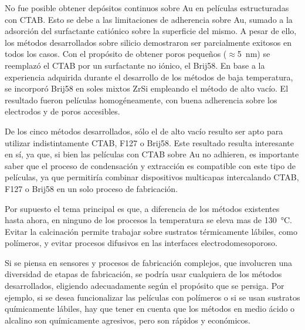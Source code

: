 	No fue posible obtener depósitos continuos sobre Au en películas estructuradas con CTAB. Esto se debe a las limitaciones de adherencia sobre Au, sumado a la adsorción del surfactante catiónico sobre la superficie del mismo. A pesar de ello, los métodos desarrollados sobre silicio demostraron ser parcialmente exitosos en todos los casos. Con el propósito de obtener poros pequeños ($\approx$\SI{5}{\nm}) se reemplazó el CTAB por un surfactante no iónico, el Brij58. En base a la experiencia adquirida durante el desarrollo de los métodos de baja temperatura, se incorporó Brij58 en soles mixtos Zr\textbar Si empleando el método de alto vacío. El resultado fueron películas homogéneamente, con buena adherencia sobre los electrodos y de poros accesibles.

	De los cinco métodos desarrollados, sólo el de alto vacío resulto ser apto para utilizar indistintamente CTAB, F127 o Brij58. Este resultado resulta interesante en sí, ya que, si bien las películas con CTAB sobre Au no adhieren, es importante saber que el proceso de condensación y extracción es compatible con este tipo de películas, ya que permitiría combinar dispositivos multicapas intercalando CTAB, F127 o Brij58 en un solo proceso de fabricación.


	
	Por supuesto el tema principal es que, a diferencia de los métodos existentes hasta ahora, en ninguno de los procesos la temperatura se eleva mas de \SI{130}{\celsius}. Evitar la calcinación permite trabajar sobre sustratos térmicamente lábiles, como polímeros, y evitar procesos difusivos en las interfaces electrodo\textbar mesoporoso. 

	Si se piensa en sensores y procesos de fabricación complejos, que involucren una diversidad de etapas de fabricación, se podría usar cualquiera de los métodos desarrollados, eligiendo adecuadamente según el propósito que se persiga. Por ejemplo, si se desea funcionalizar las películas con polímeros o si se usan sustratos químicamente lábiles, hay que tener en cuenta que los métodos en medio ácido o alcalino son químicamente agresivos, pero son rápidos y económicos. 


